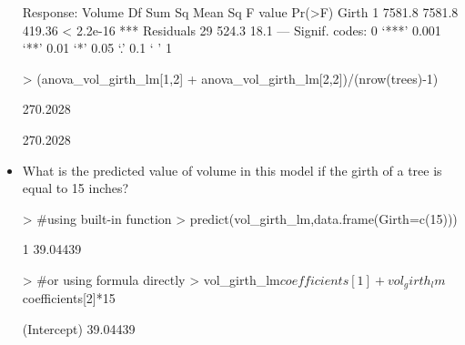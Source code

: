 \documentclass[a4paper]{article}
\begin{document}
\begin{itemize}
\begin{Schunk}
\begin{Soutput}
Response: Volume
          Df Sum Sq Mean Sq F value    Pr(>F)    
Girth      1 7581.8  7581.8  419.36 < 2.2e-16 ***
Residuals 29  524.3    18.1                      
---
Signif. codes:  0 ‘***’ 0.001 ‘**’ 0.01 ‘*’ 0.05 ‘.’ 0.1 ‘ ’ 1
\end{Soutput}
\begin{Sinput}
> (anova_vol_girth_lm[1,2] + anova_vol_girth_lm[2,2])/(nrow(trees)-1)
\end{Sinput}
\begin{Soutput}
[1] 270.2028
\end{Soutput}
\begin{Soutput}
[1] 270.2028
\end{Soutput}
\end{Schunk}
\item What is the predicted value of volume in this model if the girth of a tree is equal to 15 inches?
\begin{Schunk}
\begin{Sinput}
> #using built-in function
> predict(vol_girth_lm,data.frame(Girth=c(15)))
\end{Sinput}
\begin{Soutput}
       1 
39.04439 
\end{Soutput}
\begin{Sinput}
> #or using formula directly
> vol_girth_lm$coefficients[1]+vol_girth_lm$coefficients[2]*15
\end{Sinput}
\begin{Soutput}
(Intercept) 
   39.04439 
\end{Soutput}
\end{Schunk}
\end{itemize}
\end{document}
